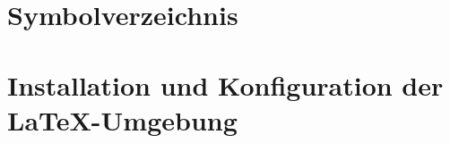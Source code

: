 \documentclass[12pt, a4paper, sectionentrydots=true, listof=totoc, listof=entryprefix, numbers=endperiod]{scrartcl}
\newcounter{SeitenzahlSpeicherRoman}
\begin{document}
\section*{Symbolverzeichnis}
\begin{spacing}{1.0}

\end{spacing}
%
%
%
%
\setcounter{SeitenzahlSpeicherRoman}{\value{page}}
\clearpage
\setcounter{page}{1}
\ofoot{- \thepage{} -}
%
%
%
%
%
%
%
%
%
%
%
%
%
%
\pagebreak
\section{Installation und Konfiguration der LaTeX-Umgebung} 
%
%
\end{document}
